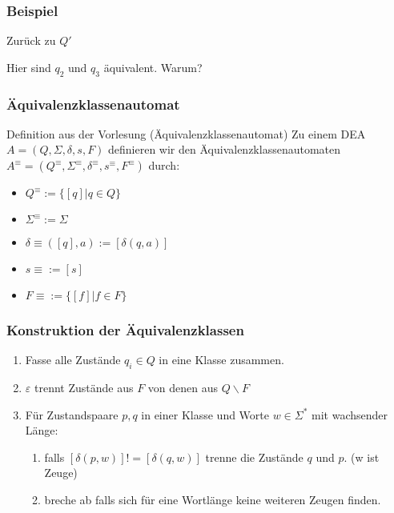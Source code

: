 \documentclass{beamer}
\begin{document}
\begin{frame}
 \frametitle{Beispiel}
 \begin{block}{Zurück zu $Q'$}
 \begin{figure}[h]
\begin{center}
\end{center}
\end{figure}
Hier sind $q_2$ und $q_3$ äquivalent. Warum?
\end{block}
\end{frame}
\begin{frame}
 \frametitle{Äquivalenzklassenautomat}
 \begin{block}{Definition aus der Vorlesung (Äquivalenzklassenautomat)}
  Zu einem DEA \(A = (Q, \Sigma, \delta, s, F)\) definieren wir den Äquivalenzklassenautomaten 
  \(A^\equiv = (Q^\equiv, \Sigma^\equiv, \delta^\equiv, s^\equiv, F^\equiv)\) durch:
  \begin{itemize}
   \item $Q^\equiv := \{[q]|q\in Q\}$
   \item $\Sigma^\equiv := \Sigma$
   \item $\delta\equiv([q], a) := [\delta(q, a)]$
   \item $s\equiv := [s]$
   \item $F\equiv:= \{[f]|f\in F\}$
  \end{itemize}
 \end{block}
\end{frame}
\begin{frame}
 \frametitle{Konstruktion der Äquivalenzklassen}
 \begin{block}{}
  \begin{enumerate}
   \item Fasse alle Zustände $q_i \in Q$ in eine Klasse zusammen.
   \item $\varepsilon$ trennt Zustände aus $F$ von denen aus $Q \backslash F$
   \item Für Zustandspaare $p, q$ in einer Klasse und
   Worte $w\in \Sigma^*$ mit wachsender Länge: 
    \begin{enumerate}
    \item falls $[\delta(p, w)] != [\delta(q, w)]$ trenne die Zustände $q$ und $p$. (w ist Zeuge)
    \item breche ab falls sich für eine Wortlänge keine weiteren Zeugen finden.
    \end{enumerate}
  \end{enumerate}
 \end{block}
\end{frame}
\end{document}
